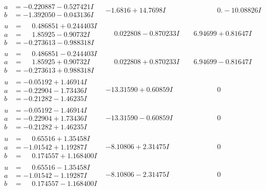 \documentclass[1p]{elsarticle_modified}
\theoremstyle{definition}
\begin{document}
$$\begin{array}{c|c|c}
\begin{aligned}
a &= -0.220887 - 0.527421 I \\
b &= -1.392050 - 0.043136 I\end{aligned}
 & -1.6816 + 14.7698 I & \phantom{-0.000000 } 0. - 10.08826 I \\ \hline\begin{aligned}
u &= \phantom{-}0.486851 + 0.244403 I \\
a &= \phantom{-}1.85925 - 0.90732 I \\
b &= -0.273613 - 0.988318 I\end{aligned}
 & \phantom{-}0.022808 - 0.870233 I & \phantom{-}6.94699 + 0.81647 I \\ \hline\begin{aligned}
u &= \phantom{-}0.486851 - 0.244403 I \\
a &= \phantom{-}1.85925 + 0.90732 I \\
b &= -0.273613 + 0.988318 I\end{aligned}
 & \phantom{-}0.022808 + 0.870233 I & \phantom{-}6.94699 - 0.81647 I \\ \hline\begin{aligned}
u &= -0.05192 + 1.46914 I \\
a &= -0.22904 - 1.73436 I \\
b &= -0.21282 - 1.46235 I\end{aligned}
 & -13.31590 + 0.60859 I & \phantom{-0.000000 } 0 \\ \hline\begin{aligned}
u &= -0.05192 - 1.46914 I \\
a &= -0.22904 + 1.73436 I \\
b &= -0.21282 + 1.46235 I\end{aligned}
 & -13.31590 - 0.60859 I & \phantom{-0.000000 } 0 \\ \hline\begin{aligned}
u &= \phantom{-}0.65516 + 1.35458 I \\
a &= -1.01542 + 1.19287 I \\
b &= \phantom{-}0.174557 + 1.168400 I\end{aligned}
 & -8.10806 + 2.31475 I & \phantom{-0.000000 } 0 \\ \hline\begin{aligned}
u &= \phantom{-}0.65516 - 1.35458 I \\
a &= -1.01542 - 1.19287 I \\
b &= \phantom{-}0.174557 - 1.168400 I\end{aligned}
 & -8.10806 - 2.31475 I & \phantom{-0.000000 } 0 \\ \hline\begin{aligned}

\end{aligned}
\end{array}$$
\end{document}
